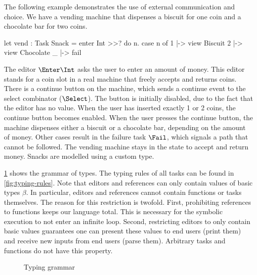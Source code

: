 \begin{example}
  \label{exm:vending-base}
  The following example demonstrates the use of external communication and choice.
  We have a vending machine that dispenses a biscuit for one coin and a chocolate bar for two coins.
  \begin{TASK}
    let vend : Task Snack = enter Int >>? do n.
      case n of
        1 |-> view Biscuit
        2 |-> view Chocolate
        _ |-> fail
  \end{TASK}
  The editor $\Enter \Int$ asks the user to enter an amount of money.
  This editor stands for a coin slot in a real machine that freely accepts and returns coins.
  There is a continue button on the machine, which sends a continue event to the select combinator ($\Select$).
  The button is initially disabled, due to the fact that the editor has no value.
  When the user has inserted exactly 1 or 2 coins, the continue button becomes enabled.
  When the user presses the continue button, the machine dispenses either a biscuit or a chocolate bar, depending on the amount of money.
  Other cases result in the failure task $\Fail$, which signals a path that cannot be followed.
  The vending machine stays in the state to accept and return money.
  Snacks are modelled using a custom type.
\end{example}


\cref{fig:typing-grammar} shows the grammar of types.
The typing rules of all tasks can be found in \cref{fig:typing-rules}.
Note that editors and references can only contain values of basic types $\beta$.
In particular, editors and references cannot contain functions or tasks themselves.
The reason for this restriction is twofold.
First, prohibiting references to functions keeps our language total.
This is necessary for the symbolic execution to not enter an infinite loop.
Second, restricting editors to only contain basic values
guarantees one can present these values to end users (print them)
and receive new inputs from end users (parse them).
Arbitrary tasks and functions do not have this property.

\begin{figure}[h]
  \caption{Typing grammar}
  \label{fig:typing-grammar}
\end{figure}

